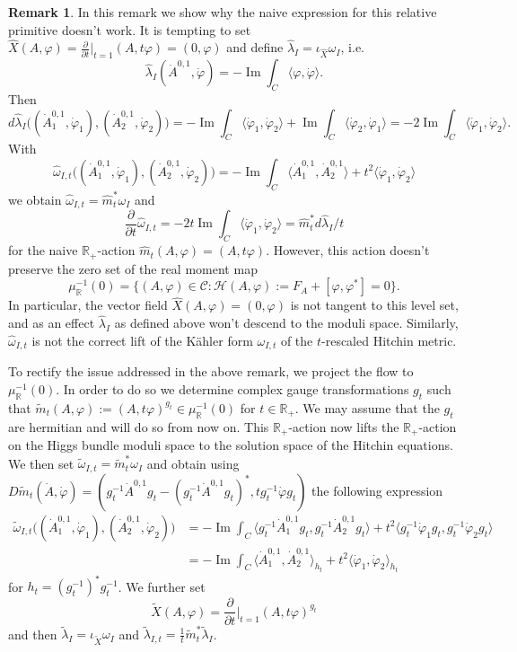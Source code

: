\documentclass[12pt,letterpaper,reqno]{amsart}
\theoremstyle{remark}
\theoremstyle{definition}
\newtheorem{rem}[thm]{Remark}
\numberwithin{thm}{section}
\numberwithin{equation}{section}
\numberwithin{figure}{section}
\newcommand{\R}{\ensuremath{\mathbb R}}
\newcommand{\IP}[1]{\langle#1\rangle}
\begin{document}
\begin{rem} In this remark we show why the naive expression for this relative primitive doesn't work.
It is tempting to set $\hat X(A,\varphi) =\frac{\partial}{\partial t} \bigr\vert_{t=1} (A,t\varphi) = (0,\varphi)$ and define $\hat\lambda_I=\iota_{\hat X} \omega_I$, i.e.
\[
\hat \lambda_I(\dot A^{0,1}, \dot \varphi) = - \operatorname{Im} \int_C \IP{\varphi,\dot \varphi}.
\]
Then 
\[
d \hat \lambda_I \bigl( (\dot A_1^{0,1}, \dot \varphi_1), (\dot A_2^{0,1}, \dot \varphi_2) \bigr) = - \operatorname{Im} \int_C \IP{\dot \varphi_1, \dot \varphi_2} + \operatorname{Im} \int_C \IP{\dot \varphi_2, \dot \varphi_1} = -2 \operatorname{Im} \int_C \IP{\dot \varphi_1, \dot \varphi_2}.
\]
With 
\[
\hat\omega_{I,t} \bigl( (\dot A_1^{0,1}, \dot \varphi_1), (\dot A_2^{0,1}, \dot \varphi_2) \bigr) = - \operatorname{Im} \int_C \IP{\dot A_1^{0,1}, \dot A_2^{0,1}} + t^2 \IP{\dot \varphi_1, \dot \varphi_2}
\]
we obtain $\hat{\omega}_{I,t}= \hat{m}_t^* \omega_I$ and
\[
\frac{\partial}{\partial t} \hat\omega_{I,t} = -2t \operatorname{Im} \int_C \IP{ \dot \varphi_1, \dot \varphi_2 } = \hat{m}_t^* d\hat\lambda_I/t
\]
for the naive $\R_+$-action $\hat{m}_t(A,\varphi)=(A,t\varphi)$. However, this action  doesn't preserve the zero set of the real moment map 
\[
\mu_\R^{-1}(0) = \{ (A,\varphi) \in \mathcal C :  \mathcal{H}(A,\varphi) := F_A + [\varphi , \varphi^* ] = 0\}.
\]
In particular, the vector field $\hat X(A,\varphi) = (0,\varphi)$ is not tangent to this level set, and as an effect $\hat\lambda_I$ as defined above won't descend to the moduli space. Similarly, $\hat \omega_{I,t}$ is not the correct lift of the K\"ahler form $\omega_{I,t}$ of the $t$-rescaled Hitchin metric.
\end{rem}

To rectify the issue addressed in the above remark,  we project the flow to $\mu_\R^{-1}(0)$. In order to do so we determine complex gauge transformations $g_t$  such that $\tilde{m}_t(A, \varphi):=(A,t\varphi)^{g_t} \in \mu_\R^{-1}(0)$ for $t \in \R_+$.  We may assume that the $g_t$ are hermitian and will do so from now on. This $\R_+$-action now lifts the $\R_+$-action on the Higgs bundle moduli space to the solution space of the Hitchin equations. We then set $\tilde{\omega}_{I,t}= \tilde{m}_t^* \omega_I$ and obtain using $D\tilde{m}_t(\dot A,\dot \varphi) = (g_t^{-1}\dot{A}^{0,1}g_t - (g_t^{-1}\dot{A}^{0,1}g_t)^*, t g_t^{-1} \dot \varphi g_t)$ the following expression
\begin{align}\label{tresckahler}
\tilde{\omega}_{I,t}\bigl( (\dot A_1^{0,1}, \dot \varphi_1), (\dot A_2^{0,1}, \dot \varphi_2) \bigr) & =  - \operatorname{Im} \int_C \IP{g_t^{-1}\dot A_1^{0,1}g_t, g_t^{-1}\dot A_2^{0,1}g_t} + t^2 \IP{g_t^{-1}\dot \varphi_1 g_t, g_t^{-1}\dot \varphi_2 g_t}\\
     &= - \operatorname{Im} \int_C \IP{\dot A_1^{0,1}, \dot A_2^{0,1}}_{h_t} + t^2 \IP{\dot \varphi_1 , \dot \varphi_2 }_{h_t}
\end{align}
for $h_t=(g_t^{-1})^*g_t^{-1}$.
We further set 
\[
\tilde X(A,\varphi) = \frac{\partial}{\partial t} \Bigr\vert_{t=1} (A,t\varphi)^{g_t}
\]
 and then $\tilde \lambda_I = \iota_{\tilde X} \omega_I$ and $\tilde\lambda_{I,t} = \frac{1}{t} \tilde m_t^* \tilde \lambda_I$. 
 
\end{document}
